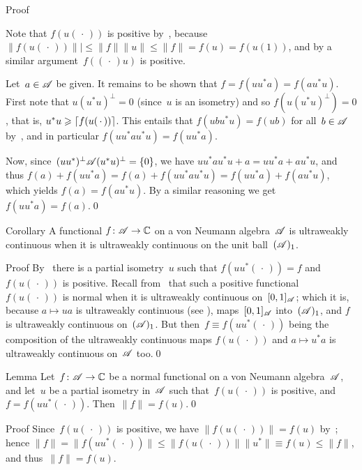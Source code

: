 \documentclass[a]{subfiles}
\begin{document}
\begin{parsec}
\begin{point}
\begin{point}{Proof}
\begin{point}
Note that $f(u(\,\cdot\,))$
is positive by~, because
$\|f(u(\,\cdot\,))\||\leq\|f\|\|u\|\leq\|f\|=f(u)=f(u(1))$,
and by a similar argument~$f((\,\cdot\,)u)$
is positive.

Let~$a\in\mathscr{A}$ be given.
It remains to be shown that $f=f(uu^*a)=f(au^*u)$.
First note that  $u(u^*u)^\perp = 0$ (since~$u$ is an isometry)
and so $f(u(u^*u)^\perp)=0$,
that is,  $u^*u\geqslant \left\lceil f(u(\,\cdot\,))\right\rceil$.
This entails that $f(ubu^*u)=f(ub)$ for all~$b\in\mathscr{A}$
by~, and in particular $f(uu^*au^*u)=f(uu^*a)$.

Now, since~$(uu^*)^\perp\mathscr{A}(u^*u)^\perp = \{0\}$,
we have $uu^* a u^*u + a = uu^*a + au^*u$,
and thus $f(a)+f(uu^*a)=f(a)+f(uu^*au^*u)=f(uu^*a)+f(au^*u)$,
which yields $f(a)=f(au^*u)$.
By a similar reasoning we get $f(uu^*a)=f(a)$.\qed
\end{point}
\end{point}
\end{point}
\begin{point}{Corollary}%
A functional $f\colon \mathscr{A}\to\mathbb{C}$
on a von Neumann algebra~$\mathscr{A}$
is ultraweakly continuous
when it is ultraweakly continuous
on the unit ball~$(\mathscr{A})_1$.
\begin{point}{Proof}%
By~
there is a partial isometry~$u$
such that $f(uu^*(\,\cdot\,))=f$
and~$f(u(\,\cdot\,))$ is positive.
Recall from~ that such a positive functional~$f(u(\,\cdot\,))$
is normal when it is ultraweakly continuous
on~$[0,1]_{\mathscr{A}}$;
which it is, 
because $a\mapsto ua$ is ultraweakly continuous (see ),
maps~$[0,1]_{\mathscr{A}}$ into~$(\mathscr{A})_1$,
and $f$ is ultraweakly continuous on~$(\mathscr{A})_1$.
But then~$f\equiv f(uu^*(\,\cdot\,))$
being the composition of the ultraweakly continuous maps
$f(u(\,\cdot\,))$ and $a\mapsto u^*a$ 
is ultraweakly continuous on~$\mathscr{A}$ too.\qed
\end{point}
\end{point}
\begin{point}{Lemma}%
Let~$f\colon \mathscr{A}\to\mathbb{C}$
be a normal functional
on a von Neumann algebra~$\mathscr{A}$,
and let~$u$ be a partial isometry in~$\mathscr{A}$
such that~$f(u(\,\cdot\,))$ is positive,
and $f=f(uu^*(\,\cdot\,))$.
Then~$\|f\|=f(u)$.\qed
\begin{point}{Proof}%
Since~$f(u(\,\cdot\,))$ is positive,
we have $\|f(u(\,\cdot\,))\|=f(u)$
by~;
hence $\|f\|=\|f(uu^*(\,\cdot\,))\|
\leq \|f(u(\,\cdot\,))\|\|u^*\|
\equiv f(u) \leq \|f\|$,
and thus~$\|f\|=f(u)$.


\end{point}
\end{point}
\end{parsec}
\end{document}
